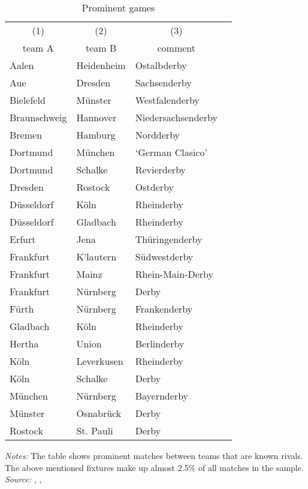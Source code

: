 \documentclass[11pt, a4paper]{article} %
\begin{document}
\vspace*{\fill}
\begin{table}[H]\centering
	\begin{threeparttable}\centering \caption{Prominent games}\label{tab_soc_ext:prominent_games_derbies}
		\begin{tabular}{lllc}
			\toprule
			\multicolumn{1}{c}{(1)}&\multicolumn{1}{c}{(2)}&\multicolumn{1}{c}{(3)}\\
			\multicolumn{1}{c}{team A} & \multicolumn{1}{c}{team B} & \multicolumn{1}{c}{comment} \\
			\midrule
			Aalen 		& Heidenheim& Ostalbderby \\
			Aue			& Dresden	& Sachsenderby \\
			Bielefeld	& Münster	& Westfalenderby \\
			Braunschweig& Hannover	& Niedersachsenderby \\
			Bremen		& Hamburg	& Nordderby \\
			Dortmund	& München	& `German Clasico' \\
			Dortmund 	& Schalke 	& Revierderby \\
			Dresden		& Rostock	& Ostderby \\
			Düsseldorf	& Köln		& Rheinderby \\
			Düsseldorf	& Gladbach	& Rheinderby \\
			Erfurt		& Jena		& Thüringenderby \\
			Frankfurt	& K'lautern	& Südwestderby \\
			Frankfurt	& Mainz		& Rhein-Main-Derby \\
			Frankfurt	& Nürnberg	& Derby \\
			Fürth		& Nürnberg	& Frankenderby \\
			Gladbach 	& Köln		& Rheinderby \\
			Hertha		& Union		& Berlinderby \\
			Köln		& Leverkusen& Rheinderby \\
			Köln		& Schalke	& Derby \\
			München		& Nürnberg	& Bayernderby \\
			Münster		& Osnabrück	& Derby \\
			Rostock		& St. Pauli & Derby \\
			\bottomrule
		\end{tabular}
		\begin{tablenotes}
			\item \scriptsize \emph{Notes:} The table shows prominent matches between teams that are known rivals. The above mentioned fixtures make up almost 2.5\% of all matches in the sample. \newline \emph{Source:} \cite{spiegel_rivals}, \cite{90min}, \cite{derbyorg}
		\end{tablenotes}
	\end{threeparttable}
\end{table}
\vspace*{\fill}\clearpage
\end{document}

